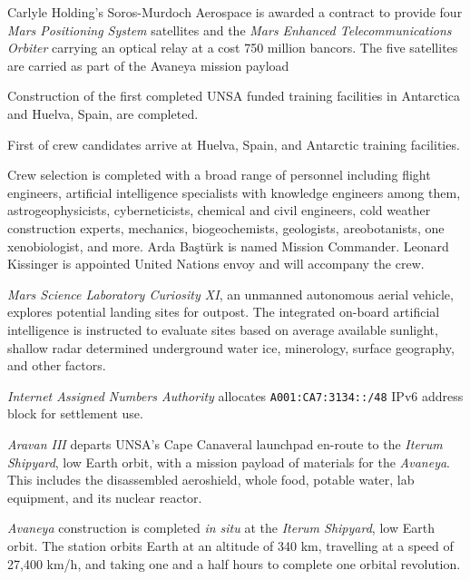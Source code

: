 Carlyle Holding's Soros-Murdoch Aerospace is awarded a contract to provide four {\it Mars Positioning System} satellites and the {\it Mars Enhanced Telecommunications Orbiter} carrying an optical relay at a cost 750 million bancors. The five satellites are carried as part of the Avaneya mission payload
\StopTimelineDate

Construction of the first completed UNSA funded training facilities in Antarctica and Huelva, Spain, are completed.
\StopTimelineDate

First of crew candidates arrive at Huelva, Spain, and Antarctic training facilities.
\StopTimelineDate

Crew selection is completed with a broad range of personnel including flight engineers, artificial intelligence specialists with knowledge engineers among them, astrogeophysicists, cyberneticists, chemical and civil engineers, cold weather construction experts, mechanics, biogeochemists, geologists, areobotanists, one xenobiologist, and more. Arda Baştürk is named Mission Commander. Leonard Kissinger is appointed United Nations envoy and will accompany the crew.
\StopTimelineDate

{\it Mars Science Laboratory Curiosity XI}, an unmanned autonomous aerial vehicle, explores potential landing sites for outpost. The integrated on-board artificial intelligence is instructed to evaluate sites based on average available sunlight, shallow radar determined underground water ice, minerology, surface geography, and other factors.
\StopTimelineDate

{\it Internet Assigned Numbers Authority} allocates {\tt A001:CA7:3134::/48} IPv6 address block for settlement use. 
\StopTimelineDate

{\it Aravan III} departs UNSA's Cape Canaveral launchpad en-route to the {\it Iterum Shipyard}, low Earth orbit, with a mission payload of materials for the {\it Avaneya}. This includes the disassembled aeroshield, whole food, potable water, lab equipment, and its nuclear reactor.
\StopTimelineDate

{\it Avaneya} construction is completed {\it in situ} at the {\it Iterum Shipyard}, low Earth orbit. The station orbits Earth at an altitude of 340 km, travelling at a speed of 27,400 km/h, and taking one and a half hours to complete one orbital revolution.
\StopTimelineDate

